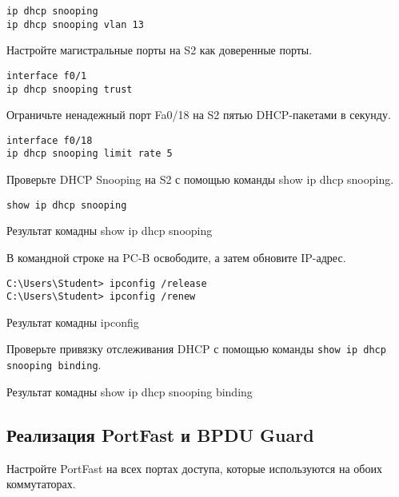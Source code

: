 \begin{verbatim}
ip dhcp snooping
ip dhcp snooping vlan 13
\end{verbatim}

Настройте магистральные порты на S2 как доверенные порты.

\begin{verbatim}
interface f0/1
ip dhcp snooping trust
\end{verbatim}

Ограничьте ненадежный порт Fa0/18 на S2 пятью DHCP-пакетами в секунду.

\begin{verbatim}
interface f0/18
ip dhcp snooping limit rate 5
\end{verbatim}

Проверьте DHCP Snooping на S2 с помощью команды show ip dhcp snooping.

\begin{verbatim}
show ip dhcp snooping
\end{verbatim}

\begin{image}
	\caption{Результат комадны show ip dhcp snooping}
\end{image}

В командной строке на PC-B освободите, а затем обновите IP-адрес.

\begin{verbatim}
C:\Users\Student> ipconfig /release
C:\Users\Student> ipconfig /renew
\end{verbatim}

\begin{image}
	\caption{Результат комадны ipconfig}
\end{image}

Проверьте привязку отслеживания DHCP
с помощью команды \texttt{show ip dhcp snooping binding}.

\begin{image}
	\caption{Результат комадны show ip dhcp snooping binding}
\end{image}

\subsection{Реализация PortFast и BPDU Guard}

Настройте PortFast на всех портах доступа,
которые используются на обоих коммутаторах.

